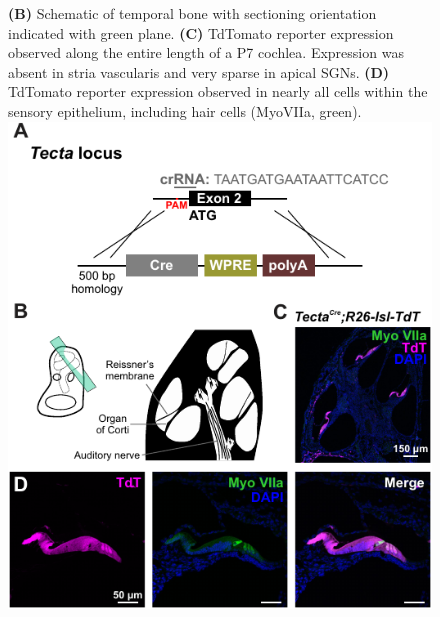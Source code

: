 \documentclass[9pt,lineno]{elife}
\begin{document}
\begin{figure} [t!]
\begin{fullwidth}
{\textbf{(B)} Schematic of temporal bone with sectioning orientation indicated with green plane.
\textbf{(C)} TdTomato reporter expression observed along the entire length of a P7 cochlea. Expression was absent in stria vascularis and very sparse in apical SGNs.
\textbf{(D)} TdTomato reporter expression observed in nearly all cells within the sensory epithelium, including hair cells (MyoVIIa, green).
}
{\includegraphics[width=.63\linewidth]{figures/Fig4p1.pdf}}\label{figsupp:sf4p1}
\end{fullwidth}
\end{figure}
\end{document}
